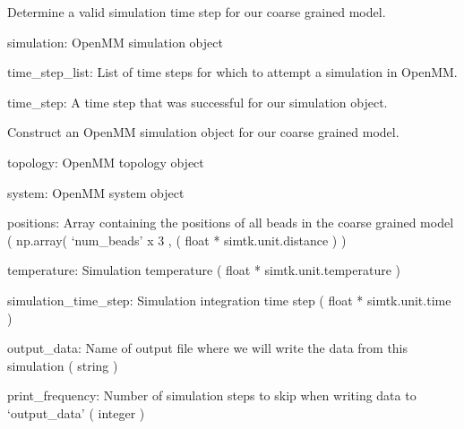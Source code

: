 \documentclass[letterpaper,12pt,english,openany,oneside]{sphinxmanual}
\begin{document}
\begin{fulllineitems}
\label{\detokenize{simulation:simulation.tools.get_simulation_time_step}}
Determine a valid simulation time step for our coarse grained model.

simulation: OpenMM simulation object

time\_step\_list: List of time steps for which to attempt a simulation in OpenMM.

time\_step: A time step that was successful for our simulation object.

\end{fulllineitems}


\begin{fulllineitems}
\label{\detokenize{simulation:simulation.tools.minimize_structure}}
Construct an OpenMM simulation object for our coarse grained model.

topology: OpenMM topology object

system: OpenMM system object

positions: Array containing the positions of all beads
in the coarse grained model
( np.array( ‘num\_beads’ x 3 , ( float * simtk.unit.distance ) )

temperature: Simulation temperature ( float * simtk.unit.temperature )

simulation\_time\_step: Simulation integration time step
( float * simtk.unit.time )

output\_data: Name of output file where we will write the data from this
simulation ( string )

print\_frequency: Number of simulation steps to skip when writing data
to ‘output\_data’ ( integer )

\end{fulllineitems}
\end{document}
